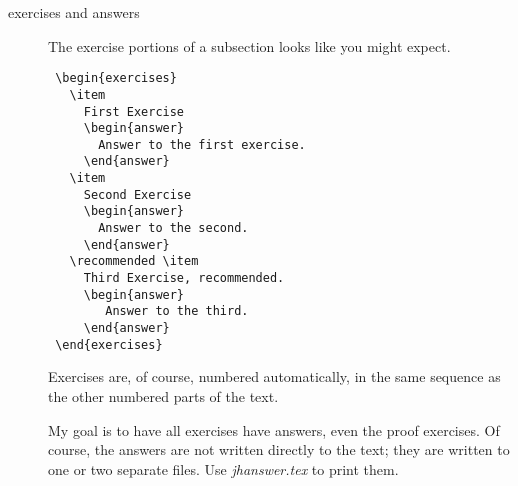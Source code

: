 \documentclass[titlepage]{article}
\begin{document}
\begin{description}
  \item[exercises and answers]
    The exercise portions of a subsection looks like you might expect.
\begin{verbatim}
 \begin{exercises}
   \item 
     First Exercise
     \begin{answer}
       Answer to the first exercise.
     \end{answer}
   \item 
     Second Exercise
     \begin{answer}
       Answer to the second.
     \end{answer}
   \recommended \item 
     Third Exercise, recommended.
     \begin{answer}
        Answer to the third.
     \end{answer}
 \end{exercises}
\end{verbatim}
    Exercises are, of course, numbered automatically, 
    in the same sequence as the
    other numbered parts of the text.

    My goal is to have all exercises have answers, even the proof exercises.
    Of course, the answers are not written directly to the text;
    they are written to one or two separate files.
    Use \textit{jhanswer.tex} to print them.
  

\end{description}
\end{document}
